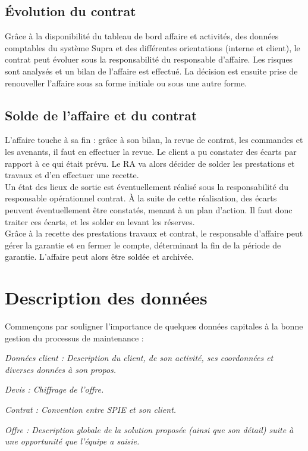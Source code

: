 \subsection{Évolution du contrat}

Grâce à la disponibilité du tableau de bord affaire et activités, des données comptables du système Supra et des différentes orientations (interne et client), le contrat peut évoluer sous la responsabilité du responsable d'affaire. Les risques sont analysés et un bilan de l'affaire est effectué. La décision est ensuite prise de renouveller l'affaire sous sa forme initiale ou sous une autre forme.

\subsection{Solde de l'affaire et du contrat}

L'affaire touche à sa fin : grâce à son bilan, la revue de contrat, les commandes et les avenants, il faut en effectuer la revue. Le client a pu constater des écarts par rapport à ce qui était prévu. Le RA va alors décider de solder les prestations et travaux et d'en effectuer une recette. \\

Un état des lieux de sortie est éventuellement réalisé sous la responsabilité du responsable opérationnel contrat. À la suite de cette réalisation, des écarts peuvent éventuellement être constatés, menant à un plan d'action. Il faut donc traiter ces écarts, et les solder en levant les réserves. \\

Grâce à la recette des prestations travaux et contrat, le responsable d'affaire peut gérer la garantie et en fermer le compte, déterminant la fin de la période de garantie. L'affaire peut alors être soldée et archivée.

\section{Description des données}

Commençons par souligner l’importance de quelques données capitales à la bonne gestion du processus de maintenance : \\

\begin{description}
\item \it{Données client :} Description du client, de son activité, ses coordonnées et diverses données à son propos.
\item \it{Devis :} Chiffrage de l’offre.
\item \it{Contrat :} Convention entre SPIE et son client.
\item \it{Offre :} Description globale de la solution proposée (ainsi que son détail) suite à une opportunité que l’équipe a saisie.
\end{description}

